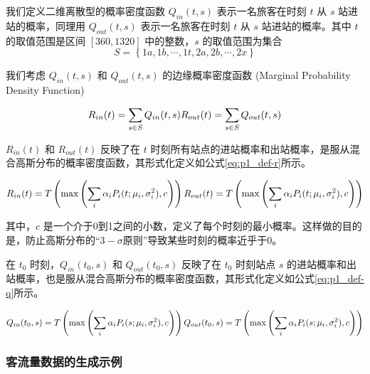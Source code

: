 \documentclass[12pt,a4paper]{mcmthesis}
\begin{document}
我们定义二维离散型的概率密度函数 $Q_{in}(t,s)$ 表示一名旅客在时刻 $t$ 从 $s$ 站进站的概率，同理用 $Q_{out}(t,s)$ 表示一名旅客在时刻 $t$ 从 $s$ 站进站的概率。其中 $t$ 的取值范围是区间 $[360,1320]$ 中的整数，$s$ 的取值范围为集合
\[ S = \left\{ 1a,1b,\cdots,1t,2a,2b,\cdots,2x \right\} \]

我们考虑 $Q_{in}(t,s)$ 和 $Q_{out}(t,s)$ 的边缘概率密度函数 (Marginal Probability Density Function)

\begin{equation*}
	R_{in}(t) = \sum_{s \in S} Q_{in}(t,s) \\
	R_{out}(t) = \sum_{s \in S} Q_{out}(t,s)
\end{equation*}

$R_{in}(t)$ 和 $R_{out}(t)$ 反映了在 $t$ 时刻所有站点的进站概率和出站概率，是服从混合高斯分布的概率密度函数，其形式化定义如公式\ref{eq:p1_def-r}所示。

\begin{equation}
	R_{in}(t) = T \left( \max \left( \sum_i \alpha_i P_i(t;\mu_i,\sigma^2_i), c \right) \right) \\
	R_{out}(t) = T \left( \max \left( \sum_i \alpha_i P_i(t;\mu_i,\sigma^2_i), c \right) \right)
	\label{eq:p1_def-r}
\end{equation}

其中，$c$ 是一个介于0到1之间的小数，定义了每个时刻的最小概率。这样做的目的是，防止高斯分布的“$3-\sigma$原则”导致某些时刻的概率近乎于0。

在 $t_0$ 时刻，$Q_{in}(t_0,s)$ 和 $Q_{out}(t_0,s)$ 反映了在 $t_0$ 时刻站点 $s$ 的进站概率和出站概率，也是服从混合高斯分布的概率密度函数，其形式化定义如公式\ref{eq:p1_def-q}所示。

\begin{equation}
	Q_{in}(t_0,s) = T \left( \max \left( \sum_i \alpha_i P_i(s;\mu_i,\sigma^2_i), c \right) \right) \\
	Q_{out}(t_0,s) = T \left( \max \left( \sum_i \alpha_i P_i(s;\mu_i,\sigma^2_i), c \right) \right)
	\label{eq:p1_def-q}
\end{equation}

\subsubsection{客流量数据的生成示例}
\end{document}
